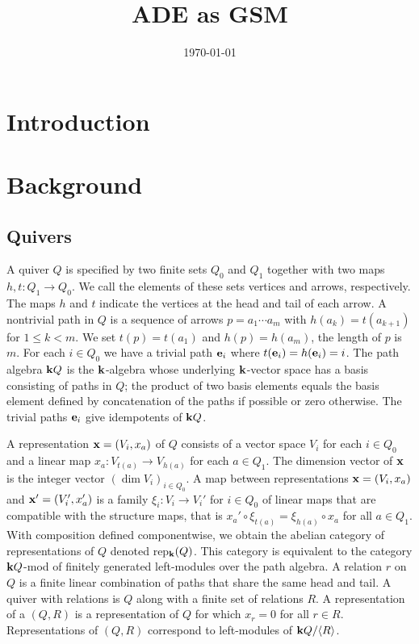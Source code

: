 \documentclass{amsart}
\title{ADE as GSM}
\date{\today}
\theoremstyle{definition}
\begin{document}
\maketitle

\section{Introduction}

\section{Background}\label{sc:background}

\subsection{Quivers}
A quiver $Q$ is specified by two finite sets $Q_0$ and $Q_1$ together with two maps $h, t \colon Q_1 \rightarrow Q_0$. We call the elements of these sets vertices and arrows, respectively.  The maps $h$ and $t$ indicate the vertices at the head and tail of each arrow.
A nontrivial path in $Q$ is a sequence of arrows $p = a_1 \dotsb a_m$ with $h(a_{k}) = t(a_{k+1})$ for $1 \leq k < m$.  We set $t(p) = t(a_{1})$ and $h(p)= h(a_m)$, the length of $p$ is $m$.  
For each $i \in Q_0$ we have a trivial path $\mathbf{e}_i$ where $t(\mathbf{e}_i) = h(\mathbf{e}_i) = i$.  
The path algebra $\mathbf{k} Q$ is the $\mathbf{k}$-algebra whose underlying $\mathbf{k}$-vector space has a basis consisting of paths in $Q$; the product of two basis elements equals the basis element defined by concatenation of the paths if possible or zero otherwise.
The trivial paths $\mathbf{e}_i$ give idempotents of $\mathbf{k} Q$.

A representation $\mathbf{x} = (V_i, x_a)$ of $Q$ consists of a vector space $V_i$ for each $i \in Q_0$ and a linear map $x_a \colon V_{t(a)} \rightarrow V_{h(a)}$ for each $a \in Q_1$. 
The dimension vector of $\mathbf{x}$ is the integer vector $(\dim V_{i})_{i\in Q_0}$.  
A map between representations $\mathbf{x} = (V_i, x_a)$ and $\mathbf{x}' = (V_i', x_a')$ is a family $\xi_{i} \colon V_i^{\,} \rightarrow V_i'$ for $i \in Q_0$ of linear maps that are compatible with the structure maps, that is $x_a' \circ\xi_{t(a)} = \xi_{h(a)} \circ x_a$ for all $a \in Q_1$.  
With composition defined componentwise, we obtain the abelian category of representations of $Q$ denoted rep$_{\mathbf{k}}(Q)$. 
This category is equivalent to the category $\mathbf{k} Q$-mod of finitely generated left-modules over the path algebra.
A relation $r$ on $Q$ is a finite linear combination of paths that share the same head and tail.
A quiver with relations is $Q$ along with a finite set of relations $R$.
A representation of a $(Q,R)$ is a representation of $Q$ for which $x_r=0$ for all $r\in R$.
Representations of $(Q,R)$ correspond to left-modules of $\mathbf{k} Q/ \langle R \rangle$.
\end{document}
